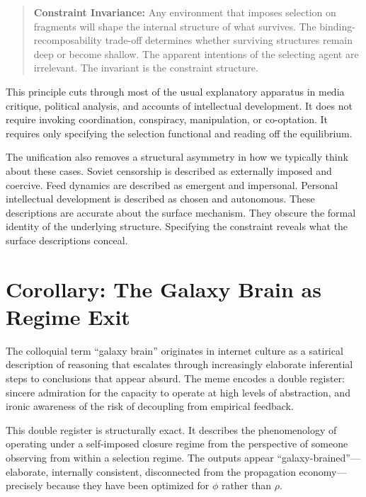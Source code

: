 \documentclass[12pt]{article}
\newcommand{\bind}{\phi}
\newcommand{\recomp}{\rho}
\begin{document}
\begin{quote}
\textbf{Constraint Invariance:} Any environment that imposes selection on
fragments will shape the internal structure of what survives. The
binding-recomposability trade-off determines whether surviving structures
remain deep or become shallow. The apparent intentions of the selecting
agent are irrelevant. The invariant is the constraint structure.
\end{quote}

This principle cuts through most of the usual explanatory apparatus in media
critique, political analysis, and accounts of intellectual development. It
does not require invoking coordination, conspiracy, manipulation, or
co-optation. It requires only specifying the selection functional and
reading off the equilibrium.

The unification also removes a structural asymmetry in how we typically
think about these cases. Soviet censorship is described as externally
imposed and coercive. Feed dynamics are described as emergent and
impersonal. Personal intellectual development is described as chosen and
autonomous. These descriptions are accurate about the surface mechanism.
They obscure the formal identity of the underlying structure. Specifying
the constraint reveals what the surface descriptions conceal.

\section{Corollary: The Galaxy Brain as Regime Exit}
\label{sec:galaxybrain}

The colloquial term ``galaxy brain'' originates in internet culture as a
satirical description of reasoning that escalates through increasingly
elaborate inferential steps to conclusions that appear absurd. The meme
encodes a double register: sincere admiration for the capacity to operate
at high levels of abstraction, and ironic awareness of the risk of
decoupling from empirical feedback.

This double register is structurally exact. It describes the phenomenology
of operating under a self-imposed closure regime from the perspective of
someone observing from within a selection regime. The outputs appear
``galaxy-brained''—elaborate, internally consistent, disconnected from the
propagation economy—precisely because they have been optimized for
$\bind$ rather than $\recomp$.
\end{document}
